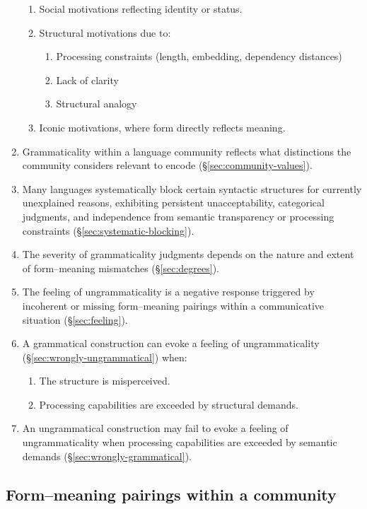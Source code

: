\documentclass[12pt,letterpaper]{article}
\begin{document}
\begin{enumerate}
\begin{enumerate}
            \item Social motivations reflecting identity or status.
            \item Structural motivations due to:
                \begin{enumerate}
                    \item Processing constraints (length, embedding, dependency distances)
                    \item Lack of clarity
                    \item Structural analogy
                \end{enumerate}
            \item Iconic motivations, where form directly reflects meaning.
        \end{enumerate}
    \item Grammaticality within a language community reflects what distinctions the community considers relevant to encode (\S\ref{sec:community-values}).
    \item Many languages systematically block certain syntactic structures for currently unexplained reasons, exhibiting persistent unacceptability, categorical judgments, and independence from semantic transparency or processing constraints (\S\ref{sec:systematic-blocking}).
    \item The severity of grammaticality judgments depends on the nature and extent of form--meaning mismatches (\S\ref{sec:degrees}).
    \item The feeling of ungrammaticality is a negative response triggered by incoherent or missing form--meaning pairings within a communicative situation (\S\ref{sec:feeling}).
    \item A grammatical construction can evoke a feeling of ungrammaticality (\S\ref{sec:wrongly-ungrammatical}) when:
        \begin{enumerate}
            \item The structure is misperceived.
            \item Processing capabilities are exceeded by structural demands.
        \end{enumerate}
    \item An ungrammatical construction may fail to evoke a feeling of ungrammaticality when processing capabilities are exceeded by semantic demands (\S\ref{sec:wrongly-grammatical}).
\end{enumerate}

\newpage
\subsection{Form--meaning pairings within a community}\label{sec:f-m-pair-in-community}
\end{document}
